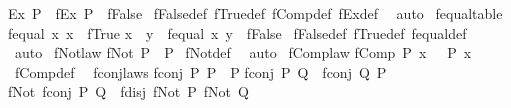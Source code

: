\begin{isabellebody}
{\isachardoublequoteopen}Ex\ P\ {\isasymor}\ fEx\ P\ {\isacharequal}{\kern0pt}\ fFalse{\isachardoublequoteclose}\isanewline
%
\isadelimproof
%
\endisadelimproof
%
\isatagproof
{}\isamarkupfalse%
\ fFalse{\isacharunderscore}{\kern0pt}def\ fTrue{\isacharunderscore}{\kern0pt}def\ fComp{\isacharunderscore}{\kern0pt}def\ fEx{\isacharunderscore}{\kern0pt}def\ \isamarkupfalse%
\ auto%
\endisatagproof
{\isafoldproof}%
%
\isadelimproof
\isanewline
%
\endisadelimproof
\isanewline
{}\isamarkupfalse%
\ fequal{\isacharunderscore}{\kern0pt}table{\isacharcolon}{\kern0pt}\isanewline
{\isachardoublequoteopen}fequal\ x\ x\ {\isacharequal}{\kern0pt}\ fTrue{\isachardoublequoteclose}\isanewline
{\isachardoublequoteopen}x\ {\isacharequal}{\kern0pt}\ y\ {\isasymor}\ fequal\ x\ y\ {\isacharequal}{\kern0pt}\ fFalse{\isachardoublequoteclose}\isanewline
%
\isadelimproof
%
\endisadelimproof
%
\isatagproof
{}\isamarkupfalse%
\ fFalse{\isacharunderscore}{\kern0pt}def\ fTrue{\isacharunderscore}{\kern0pt}def\ fequal{\isacharunderscore}{\kern0pt}def\ \isamarkupfalse%
\ auto%
\endisatagproof
{\isafoldproof}%
%
\isadelimproof
\isanewline
%
\endisadelimproof
\isanewline
{}\isamarkupfalse%
\ fNot{\isacharunderscore}{\kern0pt}law{\isacharcolon}{\kern0pt}\isanewline
{\isachardoublequoteopen}fNot\ P\ {\isasymnoteq}\ P{\isachardoublequoteclose}\isanewline
%
\isadelimproof
%
\endisadelimproof
%
\isatagproof
{}\isamarkupfalse%
\ fNot{\isacharunderscore}{\kern0pt}def\ \isamarkupfalse%
\ auto%
\endisatagproof
{\isafoldproof}%
%
\isadelimproof
\isanewline
%
\endisadelimproof
\isanewline
{}\isamarkupfalse%
\ fComp{\isacharunderscore}{\kern0pt}law{\isacharcolon}{\kern0pt}\isanewline
{\isachardoublequoteopen}fComp\ P\ x\ {\isasymlongleftrightarrow}\ {\isasymnot}\ P\ x{\isachardoublequoteclose}\isanewline
%
\isadelimproof
%
\endisadelimproof
%
\isatagproof
{}\isamarkupfalse%
\ fComp{\isacharunderscore}{\kern0pt}def\ \isacommand{{\isachardot}{\kern0pt}{\isachardot}{\kern0pt}}\isamarkupfalse%
%
\endisatagproof
{\isafoldproof}%
%
\isadelimproof
\isanewline
%
\endisadelimproof
\isanewline
{}\isamarkupfalse%
\ fconj{\isacharunderscore}{\kern0pt}laws{\isacharcolon}{\kern0pt}\isanewline
{\isachardoublequoteopen}fconj\ P\ P\ {\isasymlongleftrightarrow}\ P{\isachardoublequoteclose}\isanewline
{\isachardoublequoteopen}fconj\ P\ Q\ {\isasymlongleftrightarrow}\ fconj\ Q\ P{\isachardoublequoteclose}\isanewline
{\isachardoublequoteopen}fNot\ {\isacharparenleft}{\kern0pt}fconj\ P\ Q{\isacharparenright}{\kern0pt}\ {\isasymlongleftrightarrow}\ fdisj\ {\isacharparenleft}{\kern0pt}fNot\ P{\isacharparenright}{\kern0pt}\ {\isacharparenleft}{\kern0pt}fNot\ Q{\isacharparenright}{\kern0pt}{\isachardoublequoteclose}\isanewline

\end{isabellebody}
